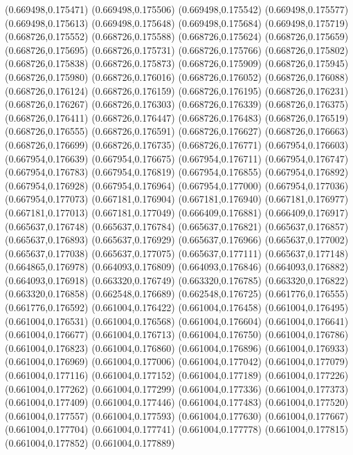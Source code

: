 (0.669498,0.175471)
(0.669498,0.175506)
(0.669498,0.175542)
(0.669498,0.175577)
(0.669498,0.175613)
(0.669498,0.175648)
(0.669498,0.175684)
(0.669498,0.175719)
(0.668726,0.175552)
(0.668726,0.175588)
(0.668726,0.175624)
(0.668726,0.175659)
(0.668726,0.175695)
(0.668726,0.175731)
(0.668726,0.175766)
(0.668726,0.175802)
(0.668726,0.175838)
(0.668726,0.175873)
(0.668726,0.175909)
(0.668726,0.175945)
(0.668726,0.175980)
(0.668726,0.176016)
(0.668726,0.176052)
(0.668726,0.176088)
(0.668726,0.176124)
(0.668726,0.176159)
(0.668726,0.176195)
(0.668726,0.176231)
(0.668726,0.176267)
(0.668726,0.176303)
(0.668726,0.176339)
(0.668726,0.176375)
(0.668726,0.176411)
(0.668726,0.176447)
(0.668726,0.176483)
(0.668726,0.176519)
(0.668726,0.176555)
(0.668726,0.176591)
(0.668726,0.176627)
(0.668726,0.176663)
(0.668726,0.176699)
(0.668726,0.176735)
(0.668726,0.176771)
(0.667954,0.176603)
(0.667954,0.176639)
(0.667954,0.176675)
(0.667954,0.176711)
(0.667954,0.176747)
(0.667954,0.176783)
(0.667954,0.176819)
(0.667954,0.176855)
(0.667954,0.176892)
(0.667954,0.176928)
(0.667954,0.176964)
(0.667954,0.177000)
(0.667954,0.177036)
(0.667954,0.177073)
(0.667181,0.176904)
(0.667181,0.176940)
(0.667181,0.176977)
(0.667181,0.177013)
(0.667181,0.177049)
(0.666409,0.176881)
(0.666409,0.176917)
(0.665637,0.176748)
(0.665637,0.176784)
(0.665637,0.176821)
(0.665637,0.176857)
(0.665637,0.176893)
(0.665637,0.176929)
(0.665637,0.176966)
(0.665637,0.177002)
(0.665637,0.177038)
(0.665637,0.177075)
(0.665637,0.177111)
(0.665637,0.177148)
(0.664865,0.176978)
(0.664093,0.176809)
(0.664093,0.176846)
(0.664093,0.176882)
(0.664093,0.176918)
(0.663320,0.176749)
(0.663320,0.176785)
(0.663320,0.176822)
(0.663320,0.176858)
(0.662548,0.176689)
(0.662548,0.176725)
(0.661776,0.176555)
(0.661776,0.176592)
(0.661004,0.176422)
(0.661004,0.176458)
(0.661004,0.176495)
(0.661004,0.176531)
(0.661004,0.176568)
(0.661004,0.176604)
(0.661004,0.176641)
(0.661004,0.176677)
(0.661004,0.176713)
(0.661004,0.176750)
(0.661004,0.176786)
(0.661004,0.176823)
(0.661004,0.176860)
(0.661004,0.176896)
(0.661004,0.176933)
(0.661004,0.176969)
(0.661004,0.177006)
(0.661004,0.177042)
(0.661004,0.177079)
(0.661004,0.177116)
(0.661004,0.177152)
(0.661004,0.177189)
(0.661004,0.177226)
(0.661004,0.177262)
(0.661004,0.177299)
(0.661004,0.177336)
(0.661004,0.177373)
(0.661004,0.177409)
(0.661004,0.177446)
(0.661004,0.177483)
(0.661004,0.177520)
(0.661004,0.177557)
(0.661004,0.177593)
(0.661004,0.177630)
(0.661004,0.177667)
(0.661004,0.177704)
(0.661004,0.177741)
(0.661004,0.177778)
(0.661004,0.177815)
(0.661004,0.177852)
(0.661004,0.177889)
